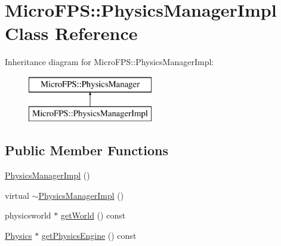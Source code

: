\hypertarget{class_micro_f_p_s_1_1_physics_manager_impl}{
\section{MicroFPS::PhysicsManagerImpl Class Reference}
\label{db/d13/class_micro_f_p_s_1_1_physics_manager_impl}
}
Inheritance diagram for MicroFPS::PhysicsManagerImpl:\begin{figure}[H]
\begin{center}
\leavevmode
\includegraphics[height=2.000000cm]{db/d13/class_micro_f_p_s_1_1_physics_manager_impl}
\end{center}
\end{figure}
\subsection*{Public Member Functions}
\begin{DoxyCompactItemize}
\item 
\hyperlink{class_micro_f_p_s_1_1_physics_manager_impl_af09006b26f696df7b219804bc065f9f6}{PhysicsManagerImpl} ()
\item 
virtual \hyperlink{class_micro_f_p_s_1_1_physics_manager_impl_a76aea8e80f9548e9ef05a9d453b3d50f}{$\sim$PhysicsManagerImpl} ()
\item 
physicsworld $\ast$ \hyperlink{class_micro_f_p_s_1_1_physics_manager_impl_a18cfb39e47dac9d116c9b69b1488e7e8}{getWorld} () const 
\item 
\hyperlink{class_micro_f_p_s_1_1_physics}{Physics} $\ast$ \hyperlink{class_micro_f_p_s_1_1_physics_manager_impl_a3226e5dae46114671c03ec8d5932fe22}{getPhysicsEngine} () const 
\end{DoxyCompactItemize}


